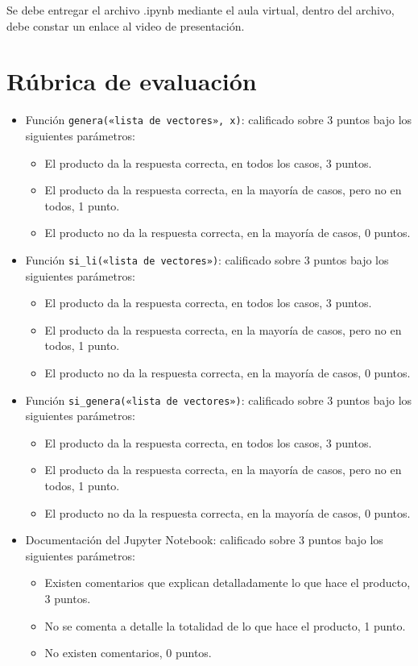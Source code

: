 \documentclass[a4,11pt]{aleph-notas}
\begin{document}
Se debe entregar el archivo .ipynb mediante el aula virtual, dentro del archivo, debe constar un enlace al video de presentación.

\section{Rúbrica de evaluación}

\begin{itemize}
\item
    Función \texttt{genera(«lista de vectores», x)}: calificado sobre 3 puntos bajo los siguientes parámetros:
    \begin{itemize}
        \item El producto da la respuesta correcta, en todos los casos, 3 puntos.
        \item El producto da la respuesta correcta, en la mayoría de casos, pero no en todos, 1 punto.
        \item El producto no da la respuesta correcta, en la mayoría de casos, 0 puntos.
    \end{itemize}
\item
    Función \texttt{si\_li(«lista de vectores»)}: calificado sobre 3 puntos bajo los siguientes parámetros:
    \begin{itemize}
        \item El producto da la respuesta correcta, en todos los casos, 3 puntos.
        \item El producto da la respuesta correcta, en la mayoría de casos, pero no en todos, 1 punto.
        \item El producto no da la respuesta correcta, en la mayoría de casos, 0 puntos.
    \end{itemize}
\item
    Función \texttt{si\_genera(«lista de vectores»)}: calificado sobre 3 puntos bajo los siguientes parámetros:
    \begin{itemize}
        \item El producto da la respuesta correcta, en todos los casos, 3 puntos.
        \item El producto da la respuesta correcta, en la mayoría de casos, pero no en todos, 1 punto.
        \item El producto no da la respuesta correcta, en la mayoría de casos, 0 puntos.
    \end{itemize}


\item
    Documentación del Jupyter Notebook: calificado sobre 3 puntos bajo los siguientes parámetros:
    \begin{itemize}
        \item Existen comentarios que explican detalladamente lo que hace el producto, 3 puntos.
        \item No se comenta a detalle la totalidad de lo que hace el producto, 1 punto.
        \item No existen comentarios, 0 puntos.
    \end{itemize}


\end{itemize}
\end{document}
